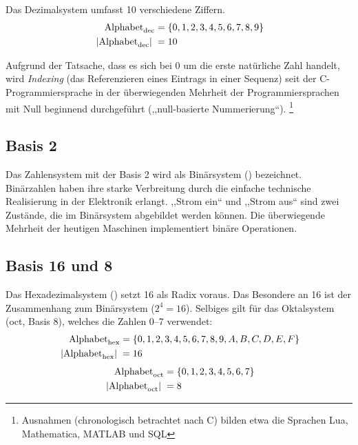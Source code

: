Das Dezimalsystem umfasst 10 verschiedene Ziffern.
\begin{align*}
         \text{Alphabet}_{\text{dec}} &= \{0, 1, 2, 3, 4, 5, 6, 7, 8, 9\} \\
  \hspace{3pt}\left| \text{Alphabet}_{\text{dec}}\right|\hspace{3pt} &= 10 
\end{align*}

Aufgrund der Tatsache, dass es sich bei $0$ um die erste natürliche Zahl handelt,
wird \emph{Indexing} (das Referenzieren eines Eintrags in einer Sequenz) seit der
C-Programmiersprache in der überwiegenden Mehrheit der Programmiersprachen
mit Null beginnend durchgeführt (,,null-basierte Nummerierung``).%
\footnote{Ausnahmen (chronologisch betrachtet nach C) bilden etwa die Sprachen
Lua, Mathematica, MATLAB und SQL}
%
\subsection{Basis 2}
%
Das Zahlensystem mit der Basis 2 wird als Binärsystem () bezeichnet.
Binärzahlen  haben ihre starke Verbreitung durch die einfache technische
Realisierung in der Elektronik erlangt. ,,Strom ein`` und ,,Strom aus``
sind zwei Zustände, die im Binärsystem abgebildet werden können.
Die überwiegende Mehrheit der heutigen Maschinen
implementiert binäre Operationen.
%
\subsection{Basis 16 und 8}
%
Das Hexadezimalsystem () setzt 16 als Radix voraus. Das Besondere an
16 ist der Zusammenhang zum Binärsystem ($2^4 = 16$). Selbiges gilt für
das Oktalsystem (oct, Basis 8), welches die Zahlen 0--7 verwendet:
%
\begin{align*}
  \text{Alphabet}_{\text{hex}} &= \{0, 1, 2, 3, 4, 5, 6, 7, 8, 9, A, B, C, D, E, F\} \\
  \hspace{3pt}\left| \text{Alphabet}_{\text{hex}}\right|\hspace{3pt} &= 16 
\end{align*}
%
\begin{align*}
  \text{Alphabet}_{\text{oct}} &= \{0, 1, 2, 3, 4, 5, 6, 7\} \\
  \hspace{3pt}\left| \text{Alphabet}_{\text{oct}}\right|\hspace{3pt} &= 8
\end{align*}
%
